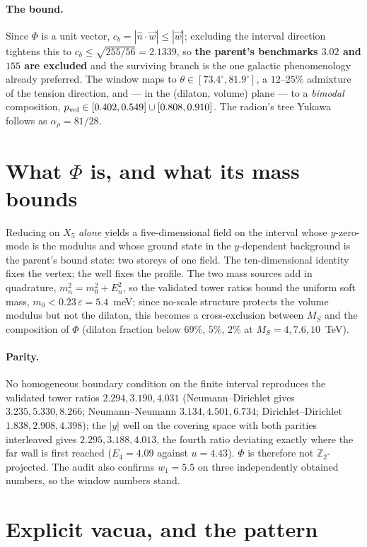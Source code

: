 \paragraph{The bound.} Since $\Phi$ is a unit vector, $c_b=|\hat n\cdot\vec w|\leq|\vec w|$; excluding the interval direction tightens this to $c_b\leq\sqrt{255/56}=2.1339$, so \textbf{the parent's benchmarks $3.02$ and $155$ are excluded} and the surviving branch is the one galactic phenomenology already preferred. The window maps to $\theta\in[73.4^\circ,81.9^\circ]$, a $12$--$25\%$ admixture of the tension direction, and --- in the (dilaton, volume) plane --- to a \emph{bimodal} composition, $p_{\rm vol}\in[0.402,0.549]\cup[0.808,0.910]$. The radion's tree Yukawa follows as $\alpha_\rho=81/28$.

\section{What $\Phi$ is, and what its mass bounds}
Reducing on $X_5$ \emph{alone} yields a five-dimensional field on the interval whose $y$-zero-mode is the modulus and whose ground state in the $y$-dependent background is the parent's bound state: two storeys of one field. The ten-dimensional identity fixes the vertex; the well fixes the profile. The two mass sources add in quadrature, $m_n^2=m_0^2+E_n^2$, so the validated tower ratios bound the uniform soft mass, $m_0<0.23\,\varepsilon=5.4$~meV; since no-scale structure protects the volume modulus but not the dilaton, this becomes a cross-exclusion between $M_S$ and the composition of $\Phi$ (dilaton fraction below $69\%$, $5\%$, $2\%$ at $M_S=4,7.6,10$~TeV).

\paragraph{Parity.} No homogeneous boundary condition on the finite interval reproduces the validated tower ratios $2.294,3.190,4.031$ (Neumann--Dirichlet gives $3.235,5.330,8.266$; Neumann--Neumann $3.134,4.501,6.734$; Dirichlet--Dirichlet $1.838,2.908,4.398$); the $|y|$ well on the covering space with both parities interleaved gives $2.295,3.188,4.013$, the fourth ratio deviating exactly where the far wall is first reached ($E_4=4.09$ against $u=4.43$). $\Phi$ is therefore not $\mathbb Z_2$-projected. The audit also confirms $w_1=5.5$ on three independently obtained numbers, so the window numbers stand.

\section{Explicit vacua, and the pattern}
